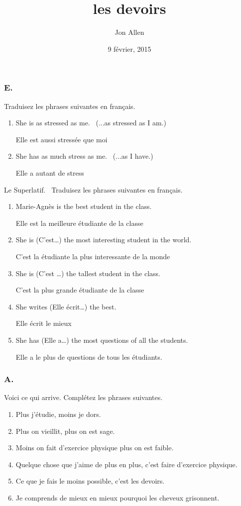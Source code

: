 \documentclass[letterpaper]{article}
\begin{document}
\title{les devoirs}
\date{9 février, 2015}
\author{Jon Allen}
\maketitle
\doublespacing
\subsubsection*{E.}
Traduisez les phrases suivantes en français.
\begin{enumerate}
\item
She is as stressed as me.  (...as stressed as I am.)

Elle est aussi stressée que moi
\item
She has as much stress as me.  (...as I have.)

Elle a autant de stress
\end{enumerate}

Le Superlatif.  Traduisez les phrases suivantes en français.

\begin{enumerate}
\item
Marie-Agnès is the best student in the class.

Elle est la meilleure étudiante de la classe
\item
She is (C’est…) the most interesting student in the world.

C'est la étudiante la plus interessante de la monde
\item
She is (C’est …) the tallest student in the class.

C'est la plus grande étudiante de la classe
\item
She writes (Elle écrit…) the best.

Elle écrit le mieux
\item
She has (Elle a…) the most questions of all the students.

Elle a le plus de questions de tous les étudiants.
\end{enumerate}
\subsubsection*{A.}
Voici ce qui arrive.  Complétez les phrases suivantes.  
\begin{enumerate}
\item
Plus j’étudie, moins je dors.
\item
Plus on vieillit, plus on est sage.
\item
Moins on fait d’exercice physique plus on est faible.
\item
Quelque chose que j’aime de plus en plus, c’est faire d'exercice physique.
\item
Ce que je fais le moins possible, c’est les devoirs.
\item
Je comprends de mieux en mieux pourquoi les cheveux grisonnent.
\end{enumerate}
\end{document}
